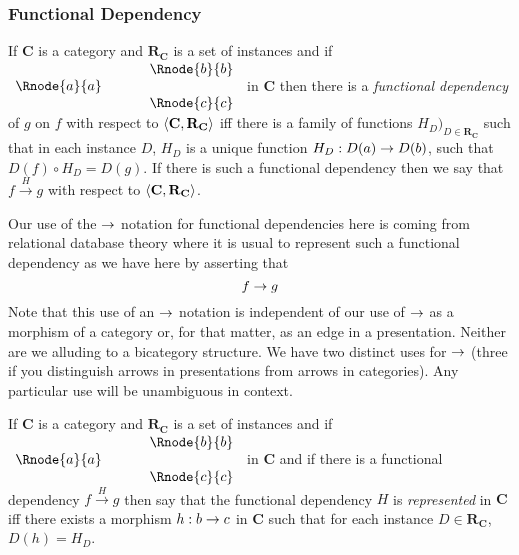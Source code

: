 \documentclass[10pt,a4paper]{article}
\theoremstyle{remark}
\newcommand{\catc}[1][C]{\textbf{#1}}
\newcommand{\reqt}{\textbf{R}}
\newcommand{\reqtc}[1][\catc]{\reqt_{#1}}
\newcommand{\fundep}[3]{#2 \xrightarrow{#1} #3}
\newcommand{\term}[1]{\textit{#1}}  %
\begin{document}
\subsubsection{Functional Dependency}
\begin{definition}
If $\catc$ is a category and $\reqtc$ is a set of instances and if
$
\begin{array}{c p{0.5cm} c  }
             &&   \Rnode{b}{b} \\[0.01cm]
\Rnode{a}{a} &&                \\[0.01cm] 
             &&   \Rnode{c}{c}         
\end{array} 
$
in $\catc$ then there is a  \term{functional dependency} of $g$ on $f$ with respect to $\tuple{\catc,\reqtc}$ iff
there is a family of functions $H_D)_{D \in \reqtc}$ such that 
in each instance $D$, $H_D$ is a unique function $H_D: D(a) \rightarrow D(b)$, such that $D(f) \circ H_D = D(g)$. 
If there is such a functional dependency then we say that $\fundep{H}{f}{g}$ with respect to $\tuple{\catc,\reqtc}$.
\end{definition}

Our use of the $\rightarrow$ notation for functional dependencies here is coming from relational database theory where it is usual to represent such a functional dependency as we have here by asserting that 
$$
f \rightarrow g
$$
Note that this use of an $\rightarrow$ notation is independent of our use of $\rightarrow$ as a morphism of a category 
or, for that matter, as an edge in a presentation. Neither are we alluding to a bicategory structure. We have two distinct uses for $\rightarrow$ (three if you distinguish arrows in presentations from arrows in categories). Any particular use will be unambiguous in context.

\begin{definition}
If $\catc$ is a category and $\reqtc$ is a set of instances and if
$
\begin{array}{c p{0.5cm} c  }
             &&   \Rnode{b}{b} \\[0.01cm]
\Rnode{a}{a} &&                \\[0.01cm] 
             &&   \Rnode{c}{c}         
\end{array} 
$
in $\catc$ 
and if there is a functional dependency $\fundep{H}{f}{g}$ then say that 
the functional dependency $H$ is \term{represented} in $\catc$ 
iff there exists a morphism $h:b \rightarrow c$ in $\catc$ such that for each instance $D \in \reqtc$, $D(h)=H_D$.
\end{definition}
\end{document}
